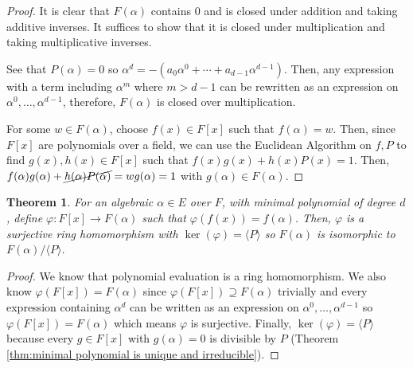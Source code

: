 \documentclass[parskip=half]{scrartcl}  %
\theoremstyle{definition}
\theoremstyle{plain}
\newtheorem{theorem}{Theorem}[definition]
\theoremstyle{remark}
\begin{document}
\begin{proof}
    It is clear that $F(\alpha)$ contains $0$ and is closed under addition and taking additive
    inverses.
    It suffices to show that it is closed under multiplication and taking multiplicative inverses.

    See that $P(\alpha)=0$ so $\alpha^d=-(a_0\alpha^0+\cdots+a_{d-1}\alpha^{d-1})$.
    Then, any expression with a term including $\alpha^m$ where $m>d-1$ can be rewritten as an
    expression on $\alpha^0,\dots,\alpha^{d-1}$, therefore, $F(\alpha)$ is closed over
    multiplication.

    For some $w\in F(\alpha)$, choose $f(x)\in F[x]$ such that $f(\alpha)=w$.
    Then, since $F[x]$ are polynomials over a field, we can use the Euclidean Algorithm on $f,P$ to
    find $g(x),h(x)\in F[x]$ such that $f(x)g(x)+h(x)P(x)=1$.
    Then, $f(\alpha)g(\alpha)+\cancel{h(\alpha)P(\alpha)}=wg(\alpha)=1$ with
    $g(\alpha)\in F(\alpha)$.
\end{proof}

\begin{theorem}
    For an algebraic $\alpha\in E$ over $F$, with minimal polynomial of degree $d$, define
    $\varphi:F[x]\to F(\alpha)$ such that $\varphi(f(x))=f(\alpha)$.
    Then, $\varphi$ is a surjective ring homomorphism with $\ker(\varphi)=\langle P\rangle$ so
    $F(\alpha)$ is isomorphic to $F(\alpha)/\langle P\rangle$.
\end{theorem}

\begin{proof}
    We know that polynomial evaluation is a ring homomorphism.
    We also know $\varphi(F[x])=F(\alpha)$ since $\varphi(F[x])\supseteq F(\alpha)$ trivially and
    every expression containing $\alpha^d$ can be written as an expression on
    $\alpha^0,\dots,\alpha^{d-1}$ so $\varphi(F[x])=F(\alpha)$ which means $\varphi$ is surjective.
    Finally, $\ker(\varphi)=\langle P\rangle$ because every $g\in F[x]$ with $g(\alpha)=0$ is
    divisible by $P$ (Theorem \ref{thm:minimal polynomial is unique and irreducible}).
\end{proof}
\end{document}
